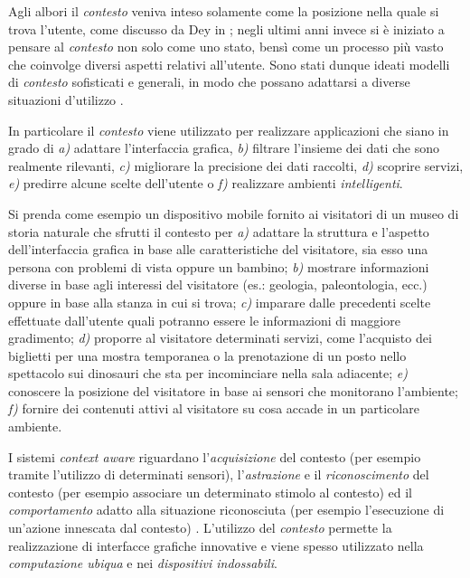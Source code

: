 Agli albori il \emph{contesto} veniva inteso solamente come la posizione nella quale si trova l'utente, come discusso da Dey in \cite{dey2001understanding}; negli ultimi anni invece si è iniziato a pensare al \emph{contesto} non solo come uno stato, bensì come un processo più vasto che coinvolge diversi aspetti relativi all'utente. Sono stati dunque ideati modelli di \emph{contesto} sofisticati e generali, in modo che possano adattarsi a diverse situazioni d'utilizzo \cite{DBLP:journals/sigmod/BolchiniCQST07} \cite{baldauf2007survey}.

In particolare il \emph{contesto} viene utilizzato per realizzare applicazioni che siano in grado di \emph{a)} adattare l'interfaccia grafica, \emph{b)} filtrare l'insieme dei dati che sono realmente rilevanti, \emph{c)} migliorare la precisione dei dati raccolti, \emph{d)} scoprire servizi, \emph{e)} predirre alcune scelte dell'utente o \emph{f)} realizzare ambienti \emph{intelligenti}.

Si prenda come esempio un dispositivo mobile fornito ai visitatori di un museo di storia naturale che sfrutti il contesto per \emph{a)} adattare la struttura e l'aspetto dell'interfaccia grafica in base alle caratteristiche del visitatore, sia esso una persona con problemi di vista oppure un bambino; \emph{b)} mostrare informazioni diverse in base agli interessi del visitatore (es.: geologia, paleontologia, ecc.) oppure in base alla stanza in cui si trova; \emph{c)} imparare dalle precedenti scelte effettuate dall'utente quali potranno essere le informazioni di maggiore gradimento; \emph{d)} proporre al visitatore determinati servizi, come l'acquisto dei biglietti per una mostra temporanea o la prenotazione di un posto nello spettacolo sui dinosauri che sta per incominciare nella sala adiacente; \emph{e)} conoscere la posizione del visitatore in base ai sensori che monitorano l'ambiente; \emph{f)} fornire dei contenuti attivi al visitatore su cosa accade in un particolare ambiente.

I sistemi \emph{context aware} riguardano l'\emph{acquisizione} del contesto (per esempio tramite l'utilizzo di determinati sensori), l'\emph{astrazione} e il \emph{riconoscimento} del contesto (per esempio associare un determinato stimolo al contesto) ed il \emph{comportamento} adatto alla situazione riconosciuta (per esempio l'esecuzione di un'azione innescata dal contesto) \cite{schmidt2003ubiquitous}. L'utilizzo del \emph{contesto} permette la realizzazione di interfacce grafiche innovative e viene spesso utilizzato nella \emph{computazione ubiqua} e nei \emph{dispositivi indossabili}.


